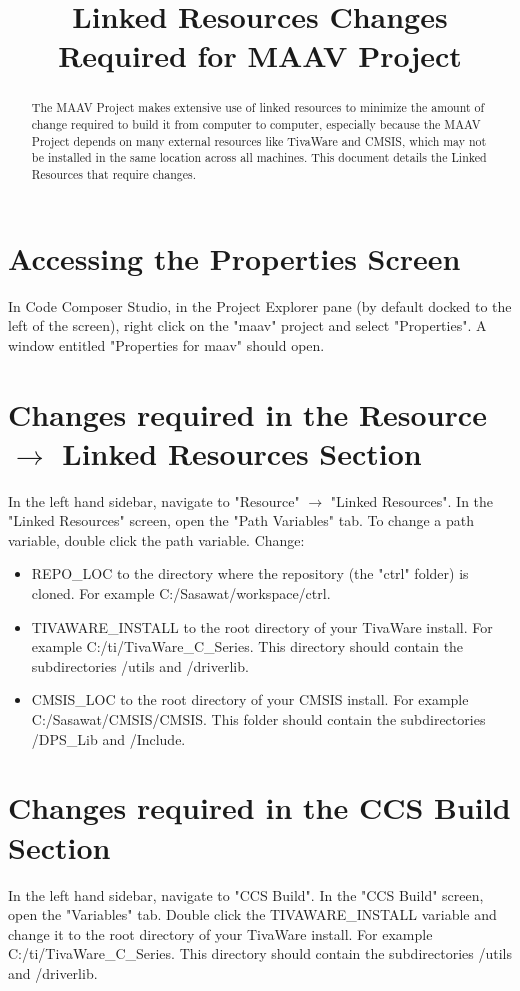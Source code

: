 \documentclass[]{article}
\title{Linked Resources Changes Required for MAAV Project}
\begin{document}
\maketitle

\begin{abstract}

The MAAV Project makes extensive use of linked resources to minimize the amount of change required to build it from computer to computer, especially because the MAAV Project depends on many external resources like TivaWare and CMSIS, which may not be installed in the same location across all machines. This document details the Linked Resources that require changes. 

\end{abstract}

\section{Accessing the Properties Screen}

In Code Composer Studio, in the Project Explorer pane (by default docked to the left of the screen), right click on the "maav" project and select "Properties". A window entitled "Properties for maav" should open. 

\section{Changes required in the Resource $\rightarrow$ Linked Resources Section}

In the left hand sidebar, navigate to "Resource" $\rightarrow$ "Linked Resources". In the "Linked Resources" screen, open the "Path Variables" tab. To change a path variable, double click the path variable. Change:
\begin{itemize}
\item REPO\_LOC to the directory where the repository (the "ctrl" folder) is cloned. For example C:/Sasawat/workspace/ctrl. 
\item TIVAWARE\_INSTALL to the root directory of your TivaWare install. For example C:/ti/TivaWare\_C\_Series. This directory should contain the subdirectories /utils and /driverlib. 
\item CMSIS\_LOC to the root directory of your CMSIS install. For example C:/Sasawat/CMSIS/CMSIS. This folder should contain the subdirectories /DPS\_Lib and /Include. 
\end{itemize}

\section{Changes required in the CCS Build Section}

In the left hand sidebar, navigate to "CCS Build". In the "CCS Build" screen, open the "Variables" tab. Double click the TIVAWARE\_INSTALL variable and change it to the root directory of your TivaWare install. For example C:/ti/TivaWare\_C\_Series. This directory should contain the subdirectories /utils and /driverlib. 
\end{document}
